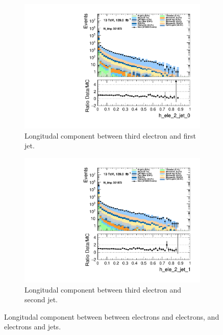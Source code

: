 \begin{figure}
\begin{subfigure}{.49\textwidth}
        \includegraphics[width=\textwidth]{Figures/MC_Data_comp/h_ele_2_jet_0.pdf}
        \caption{ Longitudal component between third electron and first jet.}
        \label{fig:h_ele_2_jet_0}
    \end{subfigure}
    \hfill
    \begin{subfigure}{.49\textwidth}
        \includegraphics[width=\textwidth]{Figures/MC_Data_comp/h_ele_2_jet_1.pdf}
        \caption{ Longitudal component between third electron and second jet.}
        \label{fig:h_ele_2_jet_1}
    \end{subfigure}
    \hfill       
    \caption{Longitudal component between between electrons and electrons, and electrons and jets.}
    \label{fig:batch5_feats}
\end{figure}

